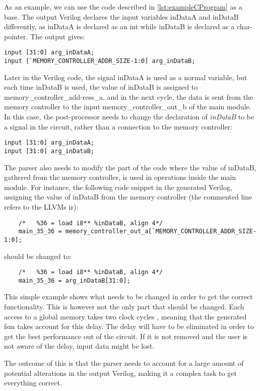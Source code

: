 As an example, we can use the code described in \cref{lst:exampleCProgram} as a base. The output Verilog declares the input variables inDataA and inDataB differently, as inDataA is declared as an int while inDataB is declared as a char-pointer. The output gives:
\lstset{language=Verilog, style=Verilogstyle}
\begin{lstlisting}
input [31:0] arg_inDataA;
input [`MEMORY_CONTROLLER_ADDR_SIZE-1:0] arg_inDataB;
\end{lstlisting}
Later in the Verilog code, the signal inDataA is used as a normal variable, but each time inDataB is used, the value of inDataB is assigned to memory\_controller\_add-ress\_a, and in the next cycle, the data is sent from the memory controller to the input memory\_controller\_out\_b of the main module. In this case, the post-processor needs to change the declaration of \textit{inDataB} to be a signal in the circuit, rather than a connection to the memory controller:
\begin{lstlisting}
input [31:0] arg_inDataA;
input [31:0] arg_inDataB;
\end{lstlisting}
The parser also needs to modify the part of the code where the value of inDataB, gathered from the memory controller, is used in operations inside the main module. For instance, the following code snippet in the generated Verilog, assigning the value of inDataB from the memory controller (the commented line refers to the LLVMs \gls{ir}):
\begin{lstlisting}
	/*   %36 = load i8** %inDataB, align 4*/
	main_35_36 = memory_controller_out_a[`MEMORY_CONTROLLER_ADDR_SIZE-1:0];
\end{lstlisting}
should be changed to:
\begin{lstlisting}
	/*   %36 = load i8** %inDataB, align 4*/
	main_35_36 = arg_inDataB[31:0];
\end{lstlisting}
This simple example shows what needs to be changed in order to get the correct functionality. This is however not the only part that should be changed. Each access to a global memory takes two clock cycles \cite{leguparch}, meaning that the generated \gls{fsm} takes account for this delay. The delay will have to be eliminated in order to get the best performance out of the circuit. If it is not removed and the user is not aware of the delay, input data might be lost.

The outcome of this is that the parser needs to account for a large amount of potential alterations in the output Verilog, making it a complex task to get everything correct.


